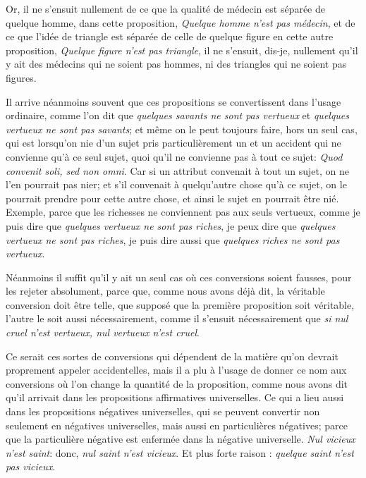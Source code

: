 Or, il ne s'ensuit nullement de ce que la qualité de médecin est séparée de quelque homme, dans cette proposition, \emph{Quelque homme n'est pas médecin}, et de ce que l'idée de triangle est séparée de celle de quelque figure en cette autre proposition, \emph{Quelque figure n'est pas triangle}, il ne s'ensuit, dis-je, nullement qu'il y ait des médecins qui ne soient pas hommes, ni des triangles qui ne soient pas figures.

Il arrive néanmoins souvent que ces propositions se convertissent dans l'usage ordinaire, comme l'on dit que \emph{quelques savants ne sont pas vertueux} et \emph{quelques vertueux ne sont pas savants}; et même on le peut toujours faire, hors un seul cas, qui est lorsqu'on nie d'un sujet pris particulièrement un et un accident qui ne convienne qu'à ce seul sujet, quoi qu'il ne convienne pas à tout ce sujet: \emph{Quod convenit soli, sed non omni}. Car si un attribut convenait à tout un sujet, on ne l'en pourrait pas nier; et s'il convenait à quelqu'autre chose qu'à ce sujet, on le pourrait prendre pour cette autre chose, et ainsi le sujet en pourrait être nié. Exemple, parce que les richesses ne conviennent pas aux seuls vertueux, comme je puis dire que \emph{quelques vertueux ne sont pas riches}, je peux dire que \emph{quelques vertueux ne sont pas riches}, je puis dire aussi que \emph{quelques riches ne sont pas vertueux}.

Néanmoins il suffit qu'il y ait un seul cas où ces conversions soient fausses, pour les rejeter absolument, parce que, comme nous avons déjà dit, la véritable conversion doit être telle, que supposé que la première proposition soit véritable, l'autre le soit aussi nécessairement, comme il s'ensuit nécessairement que \emph{si nul cruel n'est vertueux, nul vertueux n'est cruel}.

Ce serait ces sortes de conversions qui dépendent de la matière qu'on devrait proprement appeler accidentelles, mais il a plu à l'usage de donner ce nom aux conversions où l'on change la quantité de la proposition, comme nous avons dit qu'il arrivait dans les propositions affirmatives universelles. Ce qui a lieu aussi dans les propositions négatives universelles, qui se peuvent convertir non seulement en négatives universelles, mais aussi en particulières négatives; parce que la particulière négative est enfermée dans la négative universelle. \emph{Nul vicieux n'est saint}: donc, \emph{nul saint n'est vicieux}. Et  plus forte raison : \emph{quelque saint n'est pas vicieux}.
